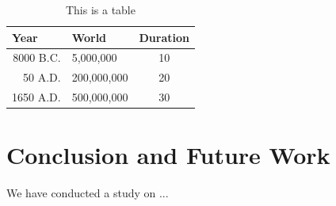 \documentclass{svproc}
\begin{document}
    
    \begin{table}
        \caption{This is a table}
        \begin{center}
            \begin{tabular}{rlc}
                \hline
                \multicolumn{1}{l}{Year}&\multicolumn{1}{l}{World}&\multicolumn{1}{l}{Duration}\\
                \hline
                8000 B.C.  &     5,000,000 &  10\\
                  50 A.D.  &   200,000,000 &  20\\
                1650 A.D.  &   500,000,000 &  30\\
                \hline
            \end{tabular}
        \end{center}
    \end{table}

\section{Conclusion and Future Work}
We have conducted a study on ...

\printbibliography 
\end{document}
